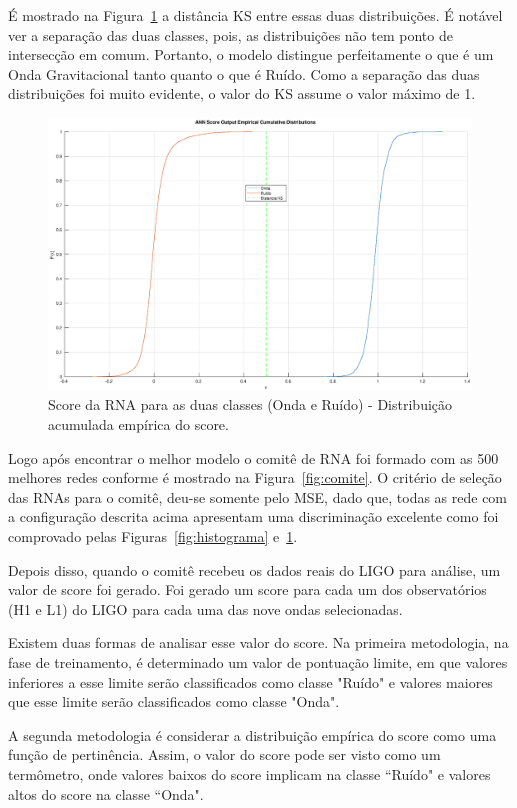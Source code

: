 É mostrado na Figura~\ref{fig:KS} a distância KS entre essas duas distribuições. É notável ver a separação das duas classes, pois, as distribuições não tem ponto de intersecção em comum. Portanto, o modelo distingue perfeitamente o que é um Onda Gravitacional tanto quanto o que é Ruído. Como a separação das duas distribuições foi muito evidente, o valor do KS assume o valor máximo de 1.

\begin{figure}[H]
\centering
\includegraphics[width=1\textwidth]{figuras/KS.eps}
\caption{Score da RNA para as duas classes (Onda e Ruído) - Distribuição acumulada empírica do score.}
\label{fig:KS}
\end{figure}

Logo após encontrar o melhor modelo o comitê de RNA foi formado com as 500 melhores redes conforme é mostrado na Figura~\ref{fig:comite}. O critério de seleção das RNAs para o comitê, deu-se somente pelo MSE, dado que, todas as rede com a configuração descrita acima apresentam uma discriminação excelente como foi comprovado pelas Figuras~\ref{fig:histograma} e~\ref{fig:KS}.

Depois disso, quando o comitê recebeu os dados reais do LIGO para análise, um valor de score foi gerado. Foi gerado um score para cada um dos observatórios (H1 e L1) do LIGO para cada uma das nove ondas selecionadas.

Existem duas formas de analisar esse valor do score. Na primeira metodologia, na fase de treinamento, é determinado um valor de pontuação limite, em que valores inferiores a esse limite serão classificados como classe "Ruído" e valores maiores que esse limite serão classificados como classe "Onda". 

A segunda metodologia é considerar a distribuição empírica do score como uma função de pertinência. Assim, o valor do score pode ser visto como um termômetro, onde valores baixos do score implicam na classe ``Ruído" e valores altos do score na classe ``Onda".

